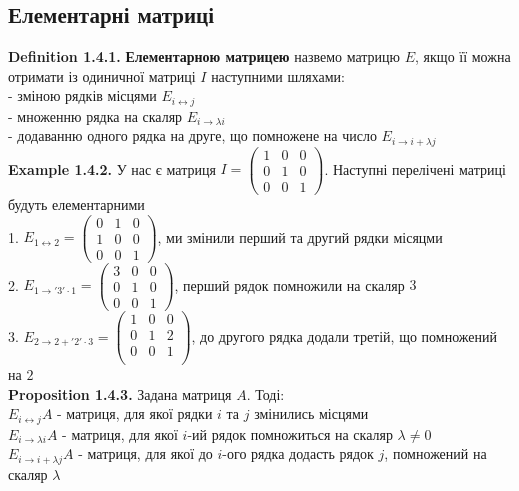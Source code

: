 \documentclass[a4paper, 10pt]{article}
\def\defin#1{\textbf{Definition {#1}}}
\def\ex#1{\textbf{Example {#1}}}
\def\prp#1{\textbf{Proposition {#1}}}
\theoremstyle{theoremdd}
\theoremstyle{theoremdd}
\theoremstyle{theoremdd}
\theoremstyle{theoremdd}
\theoremstyle{theoremdd}
\theoremstyle{theoremdd}
\theoremstyle{theoremdd}
\theoremstyle{theoremdd}
\begin{document}
	\subsection{Елементарні матриці}
	\defin{1.4.1.} \textbf{Елементарною матрицею} назвемо матрицю $E$, якщо її можна отримати із одиничної матриці $I$ наступними шляхами:\\
	- зміною рядків місцями $E_{i \leftrightarrow j}$\\
	- множенню рядка на скаляр $E_{i \rightarrow \lambda i}$\\
	- додаванню одного рядка на друге, що помножене на число $E_{i \rightarrow i + \lambda j}$
	\bigskip \\
	\ex{1.4.2.} У нас є матриця $I = \begin{pmatrix}
	1 & 0 & 0 \\
	0 & 1 & 0 \\
	0 & 0 & 1
	\end{pmatrix}$. Наступні перелічені матриці будуть елементарними\\
	1. $E_{1 \leftrightarrow 2} = \begin{pmatrix}
	0 & 1 & 0 \\
	1 & 0 & 0 \\
	0 & 0 & 1 
	\end{pmatrix}$, ми змінили перший та другий рядки місяцми\\
	2. $E_{1 \rightarrow '3' \cdot 1} = \begin{pmatrix}
	3 & 0 & 0 \\
	0 & 1 & 0 \\
	0 & 0 & 1
	\end{pmatrix}$, перший рядок помножили на скаляр $3$\\
	3. $E_{2 \rightarrow 2 + '2'\cdot 3} = \begin{pmatrix}
	1 & 0 & 0 \\
	0 & 1 & 2 \\
	0 & 0 & 1 \\
	\end{pmatrix}$, до другого рядка додали третій, що помножений на $2$
	\bigskip \\
	\prp{1.4.3.} Задана матриця $A$. Тоді:\\
	$E_{i \leftrightarrow j}A$ - матриця, для якої рядки $i$ та $j$ змінились місцями\\
	$E_{i \rightarrow \lambda i}A$ - матриця, для якої $i$-ий рядок помножиться на скаляр $\lambda \neq 0$\\
	$E_{i \rightarrow i + \lambda j}A$ - матриця, для якої до $i$-ого рядка додасть рядок $j$, помножений на скаляр $\lambda$\\
\end{document}

